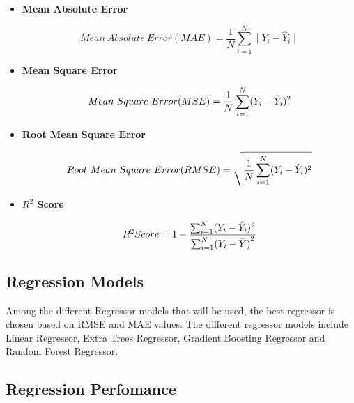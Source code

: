 \documentclass[12pt,letter-paper]{article}
\begin{document}
        \begin{itemize}
        
            \item\textbf{Mean Absolute Error}
            
                \[Mean\ Absolute\ Error(MAE) =  \frac{1}{N}\sum_{i=1}^{N}\mid Y_i - \hat Y_i\mid\]
                
            \item\textbf{Mean Square Error}
            
                \[Mean\ Square\ Error(MSE) =  \frac{1}{N}\sum_{i=1}^{N}(Y_i - \hat Y_i)\\^2\]
            
            \item\textbf{Root Mean Square Error}
            
                \[Root\ Mean\ Square\ Error(RMSE) =  \sqrt{\frac{1}{N}\sum_{i=1}^{N}(Y_i - \hat Y_i)\\^2}\]
                
                
            \item\textbf{$R^2$ Score}
            
                \[R^2 Score = 1 - \frac{\sum_{i=1}^{N}(Y_i - \hat Y_i)\\^2}{\sum_{i = 1}^{N}({Y_i - \bar{Y})}^2}\]
            
        \end{itemize}
        
    \subsection{Regression Models}
    
        Among the different Regressor models that will be used, the best regressor is chosen based on RMSE and MAE values. The different regressor models include Linear Regressor, Extra Trees Regressor, Gradient Boosting Regressor and Random Forest Regressor.
     
    \subsection{Regression Perfomance}
    
\end{document}
